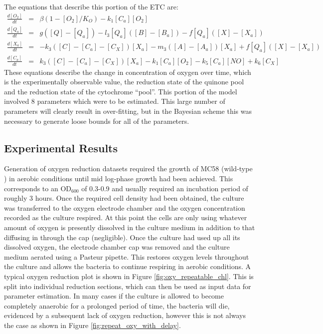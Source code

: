 The equations that describe this portion of the ETC are:
\begin{eqnarray*}
\frac{d[O_2]}{dt} & = & \beta(1-[O_2]/K_O) - k_{1}[C_a][O_2]\\
\frac{d[Q_a]}{dt} & = & g([Q] - [Q_a]) - l_3[Q_a]([B] - [B_a]) - f[Q_a]([X]-[X_a])\\
\frac{d[X_a]}{dt} & = & -k_3([C] - [C_a] - [C_X])[X_a]  - m_3([A] - [A_a])[X_a] + f[Q_a]([X]-[X_a])\\
\frac{d[C_a]}{dt} & = & k_3([C] - [C_a] - [C_X])[X_a] - k_{1}[C_a][O_2] - k_5[C_a][NO] + k_6[C_X]
\end{eqnarray*}
These equations describe the change in concentration of oxygen over time, which is the experimentally observable value, the reduction state of the quinone pool and the reduction state of the cytochrome ``pool''. This portion of the model involved 8 parameters which were to be estimated. This large number of parameters will clearly result in over-fitting, but in the Bayesian scheme this was necessary to generate loose bounds for all of the parameters.

\subsection{Experimental Results}
Generation of oxygen reduction datasets required the growth of MC58 (wild-type \Nsm{}) in aerobic conditions until mid log-phase growth had been achieved. This corresponds to an $\mathrm{OD}_{600}$ of 0.3-0.9 and usually required an incubation period of roughly 3 hours. Once the required cell density had been obtained, the  culture was transferred to the oxygen electrode chamber and the oxygen concentration recorded as the culture respired. At this point the cells are only using whatever amount of oxygen is presently dissolved in the culture medium in addition to that diffusing in through the cap (negligible). Once the culture had used up all its dissolved oxygen, the electrode chamber cap was removed and the culture medium aerated using a Pasteur pipette. This restores oxygen levels throughout the culture and allows the bacteria to continue respiring in aerobic conditions. A typical oxygen reduction plot is shown in Figure \ref{fig:oxy_repeatable_chl}. This is split into individual reduction sections, which
can then be used as input data for parameter estimation. In many cases if the culture is allowed to become completely anaerobic for a prolonged period of time, the bacteria will die, evidenced by a subsequent lack of oxygen reduction, however this is not always the case as shown in Figure \ref{fig:repeat_oxy_with_delay}.


